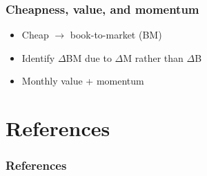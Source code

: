 \documentclass[notes]{beamer}  %
\begin{document}

\begin{frame} \frametitle{Cheapness, value, and momentum}
  \begin{itemize}
    \item Cheap $\rightarrow$ book-to-market (BM) \parencite{fama1993common}
    \item Identify $\Delta$BM due to $\Delta$M rather than $\Delta$B
    \item Monthly value + momentum \parencite{asness2013devil, kok2017facts}
  \end{itemize}
\end{frame}

\section{References}

\begin{frame}[allowframebreaks]
  \frametitle{References}
  \printbibliography
\end{frame}
\end{document}
